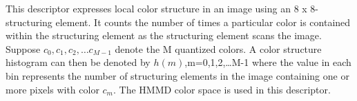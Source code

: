 This descriptor expresses local color structure in an image
using an 8 x 8-structuring element. It counts the number of
times a particular color is contained within the structuring
element as the structuring element scans the image. Suppose
$c_{0},c_{1},c_{2},\ldots c_{M-1} $ denote the M quantized colors. A color
structure histogram can then be denoted by $h(m)$,m=0,1,2,\ldots M-1 where the
value in each bin represents the number of structuring elements in the image containing one
or more pixels with color $c_{m}$. The HMMD color space is used
in this descriptor.